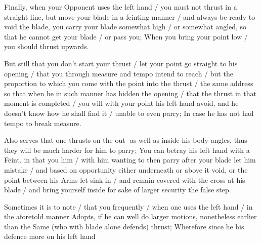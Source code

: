 Finally, when your Opponent uses the left hand / you must not thrust
in a straight line, but move your blade in a feinting manner / and
always be ready to void the blade, you carry your blade somewhat high
/ or somewhat angled, so that he cannot get your blade / or pass you;
When you bring your point low / you should thrust upwards.


But still that you don't start your thrust / let your point go straight to
his opening / that you through measure and tempo intend to reach /
but the proportion to which you come with the point into the thrust /
the same address so that when he in such manner has hidden the opening
/ that the thrust in that moment is completed / you will with your
point his left hand avoid, and he doesn't know how he shall find it / unable to
even parry; In case he has not had tempo to break measure.


Also serves that one thrusts on the out- as well as inside his body
angles, thus they will be much harder for him to parry; You can betray
his left hand with a Feint, in that you him / with him wanting to
then parry after your blade let him mistake / and based on opportunity
either underneath or above it void, or the point between his Arms let
sink in / and remain covered with the cross at his blade / and bring
yourself inside for sake of larger security the false step.


Sometimes it is to note / that you frequently / when one uses the left
hand / in the aforetold manner Adopts, if he can well do larger
motions, nonetheless earlier than the Same (who with blade alone
defends) thrust; Wherefore since he his defence more on his left hand

